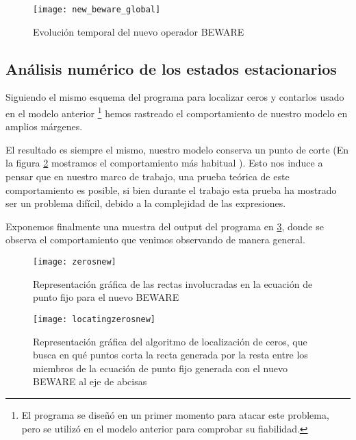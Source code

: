 \begin{figure}[h]
	\texttt{[image: new\_beware\_global]}
	\centering
	\caption{Evolución temporal del nuevo operador BEWARE}
	\label{evolu_beware}
\end{figure}

\subsection{Análisis numérico de los estados estacionarios}

Siguiendo el mismo esquema del programa para localizar ceros y contarlos usado en el modelo anterior \footnote{El programa se diseñó en un primer momento para atacar este problema, pero se utilizó en el modelo anterior para comprobar su fiabilidad.} hemos rastreado el comportamiento de nuestro modelo en amplios márgenes.

 El resultado es siempre el mismo, nuestro modelo conserva un punto de corte (En la figura \ref{locatin} mostramos el comportamiento más habitual ). Esto nos induce a pensar que en nuestro marco de trabajo, una prueba teórica de este comportamiento es posible, si bien durante el trabajo esta prueba ha mostrado ser un problema difícil, debido a la complejidad de las expresiones. 

Exponemos finalmente una muestra del output del programa en \ref{countin}, donde se observa el comportamiento que venimos observando de manera general.

\begin{figure}[h]
	\texttt{[image: zerosnew]}
	\centering
	\caption{Representación gráfica de las rectas involucradas en la ecuación de punto fijo para el nuevo BEWARE}
	\label{locatin}
\end{figure}
\begin{figure}[h]
	\texttt{[image: locatingzerosnew]}
	\centering
	\caption{Representación gráfica del algoritmo de localización de ceros, que busca en qué puntos corta la recta generada por la resta entre los miembros de la ecuación de punto fijo generada con el nuevo BEWARE al eje de abcisas}
	\label{countin}
\end{figure}







